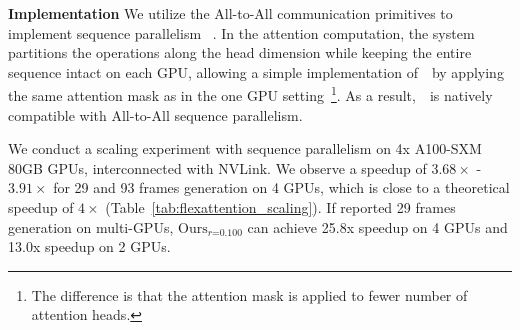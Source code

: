 

\textbf{Implementation} We utilize the All-to-All communication primitives to implement sequence parallelism ~\citep{jacobs2023deepspeed}. In the attention computation, the system partitions the operations along the head dimension while keeping the entire sequence intact on each GPU, allowing a simple implementation of~\methodname~by applying the same attention mask as in the one GPU setting~\footnote{The difference is that the attention mask is applied to fewer number of attention heads.}. As a result,~\methodname~is natively compatible with All-to-All sequence parallelism.



We conduct a scaling experiment with sequence parallelism on 4x A100-SXM 80GB GPUs, interconnected with NVLink. We observe a speedup of $3.68\times$ - $3.91\times$ for 29 and 93 frames generation on 4 GPUs, which is close to a theoretical speedup of $4\times$ (Table~\ref{tab:flexattention_scaling}).  If reported 29 frames generation on multi-GPUs, $\text{Ours}_{r\text{=0.100}}$  can achieve 25.8x speedup on 4 GPUs and 13.0x speedup on 2 GPUs.

